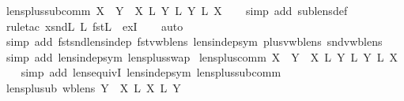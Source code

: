 \begin{isabellebody}
\isamarkupfalse%
\ lens{\isacharunderscore}plus{\isacharunderscore}sub{\isacharunderscore}comm{\isacharcolon}\ {\isachardoublequoteopen}X\ {\isasymbowtie}\ Y\ {\isasymLongrightarrow}\ X\ {\isacharplus}\isactrlsub L\ Y\ {\isasymsubseteq}\isactrlsub L\ Y\ {\isacharplus}\isactrlsub L\ X{\isachardoublequoteclose}\isanewline
%
\isadelimproof
\ \ %
\endisadelimproof
%
\isatagproof
{}\isamarkupfalse%
\ {\isacharparenleft}simp\ add{\isacharcolon}\ sublens{\isacharunderscore}def{\isacharparenright}\isanewline
\ \ \isamarkupfalse%
\ {\isacharparenleft}rule{\isacharunderscore}tac\ x{\isacharequal}{\isachardoublequoteopen}snd\isactrlsub L\ {\isacharplus}\isactrlsub L\ fst\isactrlsub L{\isachardoublequoteclose}\ \ exI{\isacharparenright}\isanewline
\ \ \isamarkupfalse%
\ {\isacharparenleft}auto{\isacharparenright}\isanewline
\ \ \isamarkupfalse%
\ {\isacharparenleft}simp\ add{\isacharcolon}\ fst{\isacharunderscore}snd{\isacharunderscore}lens{\isacharunderscore}indep\ fst{\isacharunderscore}vwb{\isacharunderscore}lens\ lens{\isacharunderscore}indep{\isacharunderscore}sym\ plus{\isacharunderscore}vwb{\isacharunderscore}lens\ snd{\isacharunderscore}vwb{\isacharunderscore}lens{\isacharparenright}\isanewline
\ \ \isamarkupfalse%
\ {\isacharparenleft}simp\ add{\isacharcolon}\ lens{\isacharunderscore}indep{\isacharunderscore}sym\ lens{\isacharunderscore}plus{\isacharunderscore}swap{\isacharparenright}\isanewline
{}\isamarkupfalse%
%
\endisatagproof
{\isafoldproof}%
%
\isadelimproof
\isanewline
%
\endisadelimproof
\isanewline
{}\isamarkupfalse%
\ lens{\isacharunderscore}plus{\isacharunderscore}comm{\isacharcolon}\ {\isachardoublequoteopen}X\ {\isasymbowtie}\ Y\ {\isasymLongrightarrow}\ X\ {\isacharplus}\isactrlsub L\ Y\ {\isasymapprox}\isactrlsub L\ Y\ {\isacharplus}\isactrlsub L\ X{\isachardoublequoteclose}\isanewline
%
\isadelimproof
\ \ %
\endisadelimproof
%
\isatagproof
{}\isamarkupfalse%
\ {\isacharparenleft}simp\ add{\isacharcolon}\ lens{\isacharunderscore}equivI\ lens{\isacharunderscore}indep{\isacharunderscore}sym\ lens{\isacharunderscore}plus{\isacharunderscore}sub{\isacharunderscore}comm{\isacharparenright}%
\endisatagproof
{\isafoldproof}%
%
\isadelimproof
\isanewline
%
\endisadelimproof
\isanewline
{}\isamarkupfalse%
\ lens{\isacharunderscore}plus{\isacharunderscore}ub{\isacharcolon}\ {\isachardoublequoteopen}wb{\isacharunderscore}lens\ Y\ {\isasymLongrightarrow}\ X\ {\isasymsubseteq}\isactrlsub L\ X\ {\isacharplus}\isactrlsub L\ Y{\isachardoublequoteclose}\isanewline

\end{isabellebody}
